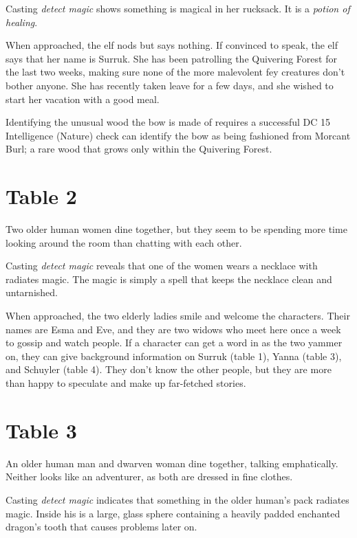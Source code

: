 \documentclass[10pt,a4paper,twoside,bg=print,twocolumn,openany,nodeprecatedcode]{dndbook}
\begin{document}
Casting \textit{detect magic} shows something is magical in her rucksack. It is a \textit{potion of healing}.

When approached, the elf nods but says nothing. If convinced to speak, the elf says that her name is Surruk. She has been patrolling the Quivering Forest for the last two weeks, making sure none of the more malevolent fey creatures don't bother anyone. She has recently taken leave for a few days, and she wished to start her vacation with a good meal.

Identifying the unusual wood the bow is made of requires a successful DC 15 Intelligence (Nature) check can identify the bow as being fashioned from Morcant Burl; a rare wood that grows only within the Quivering Forest.

\section{Table 2}
\begin{DndReadAloud}{}
Two older human women dine together, but they seem to be spending more time looking around the room than chatting with each other.

\end{DndReadAloud}

Casting \textit{detect magic} reveals that one of the women wears a necklace with radiates magic. The magic is simply a spell that keeps the necklace clean and untarnished.

When approached, the two elderly ladies smile and welcome the characters. Their names are Esma and Eve, and they are two widows who meet here once a week to gossip and watch people. If a character can get a word in as the two yammer on, they can give background information on Surruk (table 1), Yanna (table 3), and Schuyler (table 4). They don't know the other people, but they are more than happy to speculate and make up far-fetched stories.

\section{Table 3}
\begin{DndReadAloud}{}
An older human man and dwarven woman dine together, talking emphatically. Neither looks like an adventurer, as both are dressed in fine clothes.

\end{DndReadAloud}

Casting \textit{detect magic} indicates that something in the older human's pack radiates magic. Inside his is a large, glass sphere containing a heavily padded enchanted dragon's tooth that causes problems later on.
\end{document}
